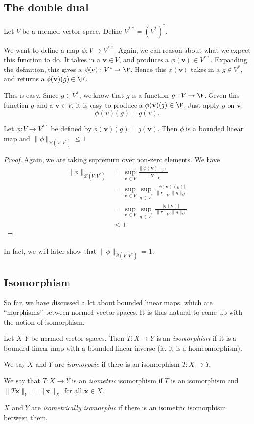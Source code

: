 \documentclass[a4paper]{article}
\begin{document}
\subsection{The double dual}
\begin{defi}
  Let $V$ be a normed vector space. Define $V^{**} = (V^*)^*$.
\end{defi}

We want to define a map $\phi: V\to V^{**}$. Again, we can reason about what we expect this function to do. It takes in a $\mathbf{v}\in V$, and produces a $\phi(\mathbf{v}) \in V^{**}$. Expanding the definition, this gives a $\phi(\mathbf{v}): V^* \to \F$. Hence this $\phi(\mathbf{v})$ takes in a $g\in V^*$, and returns a $\phi(\mathbf{v})(g)\in \F$.

This is easy. Since $g \in V^*$, we know that $g$ is a function $g: V\to \F$. Given this function $g$ and a $\mathbf{v}\in V$, it is easy to produce a $\phi(\mathbf{v})(g)\in \F$. Just apply $g$ on $\mathbf{v}$:
\[
  \phi(v)(g) = g(v).
\]
\begin{prop}
  Let $\phi: V\to V^{**}$ be defined by $\phi(\mathbf{v})(g) = g(\mathbf{v})$. Then $\phi$ is a bounded linear map and $\|\phi\|_{\mathcal{B}(V, V^*)} \leq 1$
\end{prop}

\begin{proof}
  Again, we are taking supremum over non-zero elements. We have
  \begin{align*}
    \|\phi\|_{\mathcal{B}(V, V^*)} &= \sup_{\mathbf{v}\in V} \frac{\|\phi(\mathbf{v})\|_{V^{**}}}{\|\mathbf{v}\|_V}\\
    &= \sup_{\mathbf{v}\in V} \sup_{g\in V^*}\frac{|\phi(\mathbf{v})(g)|}{\|\mathbf{v}\|_V\|g\|_{V^*}}\\
    &= \sup_{\mathbf{v}\in V}\sup_{g\in V^*}\frac{|g(\mathbf{v})|}{\|\mathbf{v}\|_V\|g\|_{V^*}}\\
    &\leq 1.
  \end{align*}
\end{proof}
In fact, we will later show that $\|\phi\|_{\mathcal{B}(V, V^*)} = 1$.

\subsection{Isomorphism}
So far, we have discussed a lot about bounded linear maps, which are ``morphisms'' between normed vector spaces. It is thus natural to come up with the notion of isomorphism.

\begin{defi}[Isomorphism]
  Let $X, Y$ be normed vector spaces. Then $T: X\to Y$ is an \emph{isomorphism} if it is a bounded linear map with a bounded linear inverse (ie. it is a homeomorphism).

  We say $X$ and $Y$ are \emph{isomorphic} if there is an isomorphism $T: X\to Y$.

  We say that $T: X\to Y$ is an \emph{isometric} isomorphism if $T$ is an isomorphism and $\|T\mathbf{x}\|_Y = \|\mathbf{x}\|_X$ for all $\mathbf{x}\in X$.

  $X$ and $Y$ are \emph{isometrically isomorphic} if there is an isometric isomorphism between them.
\end{defi}
\end{document}
